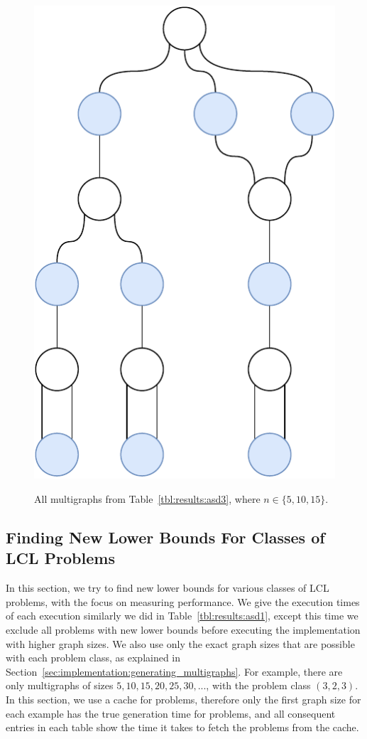 \begin{figure}[H]
{    }
    \hfill
       {
      \centering
      \includegraphics[scale=0.4]{diagrams/results_multigraph_n15_12.pdf}
    }
    \caption{All multigraphs from Table~\ref{tbl:results:asd3}, where $n \in \{5,10,15\}.$}
    \label{fig:results:graphs}
  \end{figure}


\subsection{Finding New Lower Bounds For Classes of LCL Problems} \label{sec:results:classifying_large_classes}
In this section, we try to find new lower bounds for various classes of LCL problems, with the focus on measuring performance.
We give the execution times of each execution similarly we did in Table~\ref{tbl:results:asd1}, except this time we exclude all problems with new lower bounds before executing the implementation with higher graph sizes.
We also use only the exact graph sizes that are possible with each problem class, as explained in Section~\ref{sec:implementation:generating_multigraphs}.
For example, there are only multigraphs of sizes $5, 10, 15, 20, 25, 30, ...$, with the problem class $(3,2,3)$.
In this section, we use a cache for problems, therefore only the first graph size for each example has the true generation time for problems, and all consequent entries in each table show the time it takes to fetch the problems from the cache.

